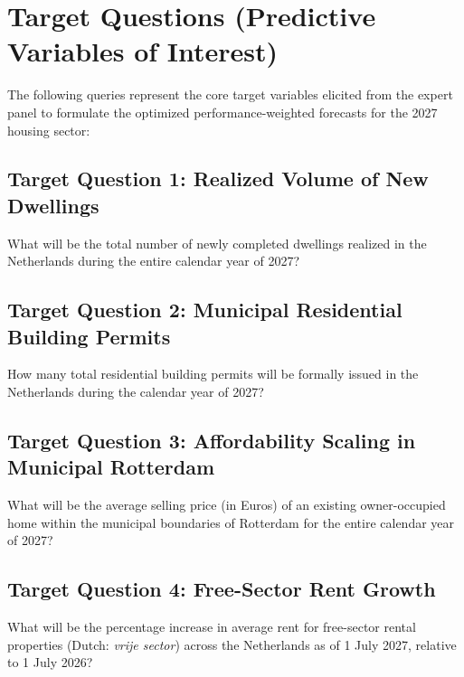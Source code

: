 \section{Target Questions (Predictive Variables of Interest)}
\label{app:sec_targets}

The following queries represent the core target variables elicited from the expert panel to formulate the optimized performance-weighted forecasts for the 2027 housing sector:

\subsection*{Target Question 1: Realized Volume of New Dwellings}
What will be the total number of newly completed dwellings realized in the Netherlands during the entire calendar year of 2027?

\subsection*{Target Question 2: Municipal Residential Building Permits}
How many total residential building permits will be formally issued in the Netherlands during the calendar year of 2027?

\subsection*{Target Question 3: Affordability Scaling in Municipal Rotterdam}
What will be the average selling price (in Euros) of an existing owner-occupied home within the municipal boundaries of Rotterdam for the entire calendar year of 2027?

\subsection*{Target Question 4: Free-Sector Rent Growth}
What will be the percentage increase in average rent for free-sector rental properties (Dutch: \textit{vrije sector}) across the Netherlands as of 1 July 2027, relative to 1 July 2026?
